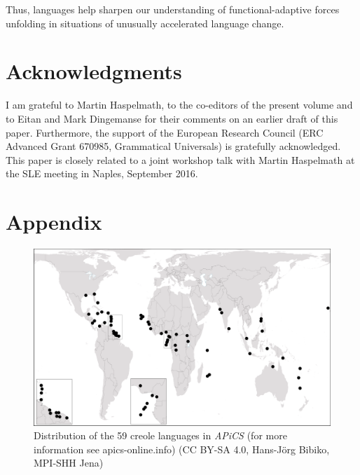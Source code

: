 \documentclass[output=paper]{langsci/langscibook}
\begin{document}
Thus,  languages help sharpen our understanding of functional-adaptive forces unfolding in situations of unusually accelerated language change.

\section*{Acknowledgments}

I am grateful to Martin Haspelmath, to the co-editors of the present volume and to Eitan  and Mark Dingemanse for their comments on an earlier draft of this paper. Furthermore, the support of the European Research Council (ERC Advanced Grant 670985, Grammatical Universals) is gratefully acknowledged. This paper is closely related to a joint workshop talk with Martin Haspelmath at the SLE meeting in Naples, September 2016.

\section*{Appendix}

\begin{figure}
\includegraphics[width=\textwidth]{figures/Michaelis-Fig1.png}
\caption{Distribution of the 59 creole languages in \textit{APiCS} (for more information see apics-online.info) (CC BY-SA 4.0, Hans-Jörg Bibiko, MPI-SHH Jena)}
\label{fig:michaelis:1}
\end{figure}

\sloppy
\printbibliography[heading=subbibliography,notkeyword=this] 
\end{document}
